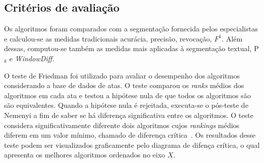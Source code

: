 




\subsection{Critérios de avaliação}



Os algoritmos foram comparados com a segmentação fornecida pelos especialistas e calculou-se as medidas tradicionais acurácia, precisão, revocação, $F^1$. Além dessas, computou-se também as medidas mais aplicadas à segmentação textual, P$_k$ e \textit{WindowDiff}.



%
O teste de Friedman foi utilizado para avaliar o desempenho dos algoritmos considerando a base de dados de atas. 
%
O teste comparou os \textit{ranks} médios dos algoritmos em cada ata e testou a hipótese nula de que todos os algoritmos são são equivalentes. 
%
Quando a hipótese nula é rejeitada, executa-se o pós-teste de Nemenyi a fim de saber se há diferença significativa entre os algoritmos. O teste considera significativamente diferente dois algoritmos cujos \textit{rankings} médios diferem em um valor mínimo, chamado de diferença crítica~\cite{Demsar2006}.
%
Os resultados desse teste podem ser visualizados graficamente pelo diagrama de difença crítica, o qual apresenta os melhores algoritmos ordenados no eixo $X$.


